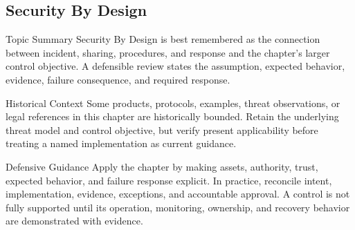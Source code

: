 \documentclass[11pt,letterpaper]{article}
\begin{document}
\subsection*{Security By Design}
\begin{CornellNotesTable}
\end{CornellNotesTable}
\begin{CornellSummaryBox}{Topic Summary}
Security By Design is best remembered as the connection between incident, sharing, procedures, and response and the chapter's larger control objective. A defensible review states the assumption, expected behavior, evidence, failure consequence, and required response.
\end{CornellSummaryBox}
\begin{CornellWarningBox}{Historical Context}
Some products, protocols, examples, threat observations, or legal references in this chapter are historically bounded. Retain the underlying threat model and control objective, but verify present applicability before treating a named implementation as current guidance.
\end{CornellWarningBox}
\begin{CornellOverviewBox}{Defensive Guidance}
Apply the chapter by making assets, authority, trust, expected behavior, and failure response explicit. In practice, reconcile intent, implementation, evidence, exceptions, and accountable approval. A control is not fully supported until its operation, monitoring, ownership, and recovery behavior are demonstrated with evidence.
\end{CornellOverviewBox}
\end{document}

